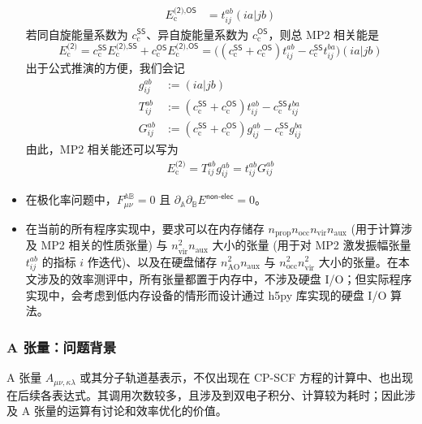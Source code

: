 \begin{itemize}[nosep]
\begin{align}
          E_\mathrm{c}^{\textsf{(2)}, \textsf{OS}} &= t_{ij}^{ab} (ia|jb) 
        \end{align}
        若同自旋能量系数为 $c_\mathrm{c}^\textsf{SS}$、异自旋能量系数为 $c_\mathrm{c}^\textsf{OS}$，则总 MP2 相关能是
        \begin{equation}
          E_\mathrm{c}^{\textsf{(2)}} = c_\mathrm{c}^\textsf{SS} E_\mathrm{c}^{\textsf{(2)}, \textsf{SS}} + c_\mathrm{c}^\textsf{OS} E_\mathrm{c}^{\textsf{(2)}, \textsf{OS}} = \big( (c_\mathrm{c}^\textsf{SS} + c_\mathrm{c}^\textsf{OS}) t_{ij}^{ab} - c_\mathrm{c}^\textsf{SS} t_{ij}^{ba} \big) (ia|jb)
        \end{equation}
        出于公式推演的方便，我们会记
        \begin{align}
          g_{ij}^{ab} &:= (ia|jb) \\
          T_{ij}^{ab} &:= (c_\mathrm{c}^\textsf{SS} + c_\mathrm{c}^\textsf{OS}) t_{ij}^{ab} - c_\mathrm{c}^\textsf{SS} t_{ij}^{ba} \\
          G_{ij}^{ab} &:= (c_\mathrm{c}^\textsf{SS} + c_\mathrm{c}^\textsf{OS}) g_{ij}^{ab} - c_\mathrm{c}^\textsf{SS} g_{ij}^{ba}
        \end{align}
        由此，MP2 相关能还可以写为
        \begin{align}
          E_\mathrm{c}^\textsf{(2)} = T_{ij}^{ab} g_{ij}^{ab} = t_{ij}^{ab} G_{ij}^{ab}
        \end{align}
  \item 在极化率问题中，$F_{\mu \nu}^\mathbb{AB} = 0$ 且 $\partial_\mathbb{A} \partial_\mathbb{B} E^\textsf{non-elec} = 0$。
  \item 在当前的所有程序实现中，要求可以在内存储存 $n_\mathrm{prop} n_\mathrm{occ} n_\mathrm{vir} n_\mathrm{aux}$ (用于计算涉及 MP2 相关的性质张量) 与 $n_\mathrm{vir}^2 n_\mathrm{aux}$ 大小的张量 (用于对 MP2 激发振幅张量 $t_{ij}^{ab}$ 的指标 $i$ 作迭代)、以及在硬盘储存 $n_\mathrm{AO}^2 n_\mathrm{aux}$ 与 $n_\mathrm{occ}^2 n_\mathrm{vir}^2$ 大小的张量。在本文涉及的效率测评中，所有张量都置于内存中，不涉及硬盘 I/O；但实际程序实现中，会考虑到低内存设备的情形而设计通过 h5py 库实现的硬盘 I/O 算法。
\end{itemize}

\subsubsection{A 张量：问题背景}

A 张量 $A_{\mu \nu, \kappa \lambda}$ 或其分子轨道基表示，不仅出现在 CP-SCF 方程的计算中、也出现在后续各表达式。其调用次数较多，且涉及到双电子积分、计算较为耗时；因此涉及 A 张量的运算有讨论和效率优化的价值。

